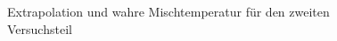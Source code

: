 \documentclass[11pt,a4paper]{article}
\begin{document}
\begin{figure}[p]
\centering
{}
\renewcommand\thefigure{B3}
\caption[graph2]{Extrapolation und wahre Mischtemperatur f\"ur den zweiten Versuchsteil}
\label{Abb:3}
\end{figure}
\end{document}
